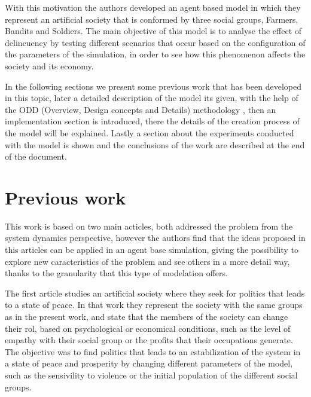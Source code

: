 \documentclass{wscpaperproc}
\theoremstyle{wsc}
\begin{document}
With this motivation the authors developed an agent based model in which they
represent an artificial society that is conformed by three social groups,
Farmers, Bandits and Soldiers. The main objective of this model is to
analyse the effect of delincuency by testing different scenarios that
occur based on the configuration of the parameters of the simulation,
in order to see how this phenomenon affects the society and its
economy.

In the following sections we present some previous work that has been developed
in this topic, later a detailed description of the model its given, with the
help of the ODD (Overview, Design concepts and Details) methodology \cite{odd},
then an implementation section is introduced, there the details of the creation 
process of the model will be explained. Lastly a section about the experiments
conducted with the model is shown and the conclusions of the work are described
at the end of the document.

\section{Previous work}

This work is based on two main acticles, both addressed the problem from the     
system dynamics perspective, however the authors find that the ideas proposed in 
this articles can be applied in an agent base simulation, giving the possibility 
to explore new caracteristics of the problem and see others in a more            
detail way, thanks to the granularity that this type of modelation offers.       
                                                                                 
The first article studies an artificial society where they seek for politics     
that leads to a state of peace. In that work they represent the society with     
the same groups as in the present work, and state that the members of the        
society can change their rol, based on psychological or economical conditions,   
such as the level of empathy with their social group or the profits              
that their occupations generate. The objective was to find politics              
that leads to an estabilization of the system in a state of peace and            
prosperity by changing different parameters of the model, such as the            
sensivility to violence or the initial population of the different social        
groups. \cite{article1}                                                                                                                                                                        
                                                                                 
\end{document}
